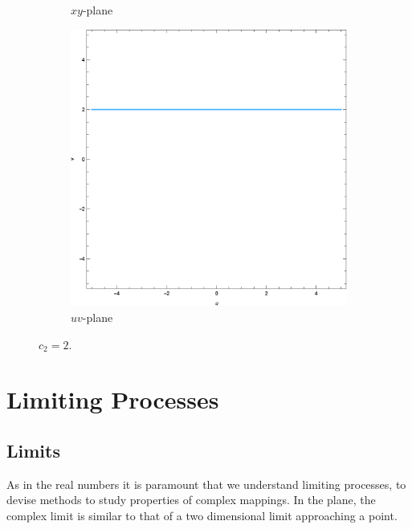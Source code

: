 \documentclass[12pt]{book}
\begin{document}
\begin{enumerate}
\begin{enumerate}[label = {(\roman*)}]
\begin{figure}[H]
\begin{subfigure}{0.45\textwidth}
                    \caption{$xy$-plane}
                \end{subfigure}
                \qquad
                \begin{subfigure}{0.45\textwidth}
                    \centering
                    \includegraphics[width = \textwidth]{./figs/chapter_1/f_map_2_4.eps}
                    \caption{$uv$-plane}
                \end{subfigure}
                \caption{$c_2 = 2.$}
            \end{figure}
    \end{enumerate}
\end{enumerate}

\section{Limiting Processes}
\subsection{Limits}
As in the real numbers it is paramount that we understand limiting processes, to devise methods to study properties of complex mappings. In the plane, the complex limit is similar to that of a two dimensional limit approaching a point.
\end{document}
